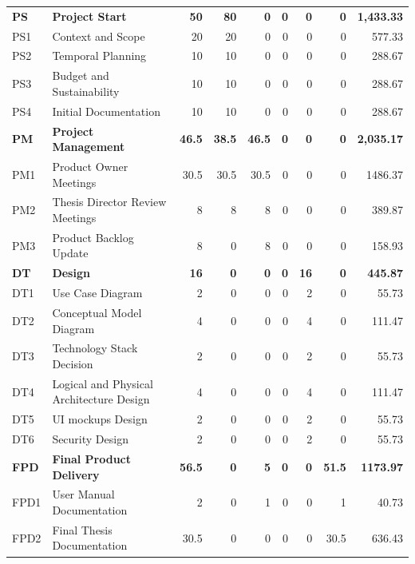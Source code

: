 \begin{longtable}{@{}l p{8.5cm} r r r r r r r@{}}
\rowcolor{gray!20}
\textbf{PS} & \textbf{Project Start} & \textbf{50} & \textbf{80} & \textbf{0} & \textbf{0} & \textbf{0} & \textbf{0} & \textbf{1,433.33} \\ 
\rowcolor{gray!05}
PS1 & Context and Scope & 20 & 20 & 0 & 0 & 0 & 0 & 577.33 \\
\rowcolor{gray!05}
PS2 & Temporal Planning & 10 & 10 & 0 & 0 & 0 & 0 & 288.67 \\
\rowcolor{gray!05}
PS3 & Budget and Sustainability & 10 & 10 & 0 & 0 & 0 & 0 & 288.67 \\
\rowcolor{gray!05}
PS4 & Initial Documentation & 10 & 10 & 0 & 0 & 0 & 0 & 288.67 \\
\rowcolor{gray!20}
\textbf{PM} & \textbf{Project Management} & \textbf{46.5} & \textbf{38.5} & \textbf{46.5} & \textbf{0} & \textbf{0} & \textbf{0} & \textbf{2,035.17} \\
\rowcolor{gray!05}
PM1 & Product Owner Meetings & 30.5 & 30.5 & 30.5 & 0 & 0 & 0 & 1486.37 \\  
\rowcolor{gray!05}
PM2 & Thesis Director Review Meetings & 8 & 8 & 8 & 0 & 0 & 0 & 389.87 \\
\rowcolor{gray!05}
PM3 & Product Backlog Update & 8 & 0 & 8 & 0 & 0 & 0 & 158.93 \\
\rowcolor{gray!20}
\textbf{DT} & \textbf{Design} & \textbf{16} & \textbf{0} & \textbf{0} & \textbf{0} & \textbf{16} & \textbf{0} & \textbf{445.87} \\
\rowcolor{gray!05}
DT1 & Use Case Diagram & 2 & 0 & 0 & 0 & 2 & 0 & 55.73 \\
\rowcolor{gray!05}
DT2 & Conceptual Model Diagram & 4 & 0 & 0 & 0 & 4 & 0 & 111.47 \\
\rowcolor{gray!05}
DT3 & Technology Stack Decision & 2 & 0 & 0 & 0 & 2 & 0 & 55.73 \\
\rowcolor{gray!05}
DT4 & Logical and Physical Architecture Design & 4 & 0 & 0 & 0 & 4 & 0 & 111.47 \\
\rowcolor{gray!05}
DT5 & UI mockups Design & 2 & 0 & 0 & 0 & 2 & 0 & 55.73 \\
\rowcolor{gray!05}
DT6 & Security Design & 2 & 0 & 0 & 0 & 2 & 0 & 55.73 \\
\rowcolor{gray!20}
\textbf{FPD} & \textbf{Final Product Delivery} & \textbf{56.5} & \textbf{0} & \textbf{5} & \textbf{0} & \textbf{0} & \textbf{51.5} & \textbf{1173.97} \\
\rowcolor{gray!05}
FPD1 & User Manual Documentation & 2 & 0 & 1 & 0 & 0 & 1 & 40.73 \\
\rowcolor{gray!05}
FPD2 & Final Thesis Documentation & 30.5 & 0 & 0 & 0 & 0 & 30.5 & 636.43 \\

\end{longtable}
